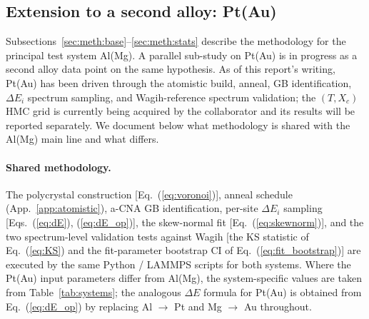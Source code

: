 \subsection{Extension to a second alloy: Pt(Au)}\label{sec:meth:ptau}

Subsections~\ref{sec:meth:base}--\ref{sec:meth:stats} describe the
methodology for the principal test system Al(Mg). A parallel sub-study
on Pt(Au) is in progress as a second alloy data point on the same
hypothesis. As of this report's writing, Pt(Au) has been driven
through the atomistic build, anneal, GB identification, $\Delta E_i$
spectrum sampling, and Wagih-reference spectrum validation; the
$(T, X_c)$ HMC grid is currently being acquired by the collaborator
and its results will be reported separately. We document below what
methodology is shared with the Al(Mg) main line and what differs.

\paragraph*{Shared methodology.}
The polycrystal construction [Eq.~(\ref{eq:voronoi})], anneal schedule
(App.~\ref{app:atomistic}), a-CNA GB identification, per-site
$\Delta E_i$ sampling [Eqs.~(\ref{eq:dE}), (\ref{eq:dE_op})], the
skew-normal fit [Eq.~(\ref{eq:skewnorm})], and the two spectrum-level
validation tests against Wagih [the KS statistic of
Eq.~(\ref{eq:KS}) and the fit-parameter bootstrap CI of
Eq.~(\ref{eq:fit_bootstrap})] are executed by the same Python /
LAMMPS scripts for both systems. Where the Pt(Au) input parameters
differ from Al(Mg), the system-specific values are taken from
Table~\ref{tab:systems}; the analogous $\Delta E$ formula for Pt(Au)
is obtained from Eq.~(\ref{eq:dE_op}) by replacing Al $\to$ Pt and
Mg $\to$ Au throughout.

